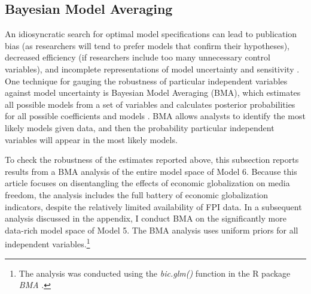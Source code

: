 \documentclass[12pt,a4paper]{article}\usepackage[]{graphicx}\usepackage[]{color}
\begin{document}
\subsection{Bayesian Model Averaging}

An idiosyncratic search for optimal model specifications can lead to publication bias (as researchers will tend to prefer models that confirm their hypotheses), decreased efficiency (if researchers include too many unnecessary control variables), and incomplete representations of model uncertainty and sensitivity \parencite[2]{Montgomery:2010fc}. One technique for gauging the robustness of particular independent variables against model uncertainty is Bayesian Model Averaging (BMA), which estimates all possible models from a set of variables and calculates posterior probabilities for all possible coefficients and models \parencite[4]{Montgomery:2010fc}. BMA allows analysts to identify the most likely models given data, and then the probability particular independent variables will appear in the most likely models.

To check the robustness of the estimates reported above, this subsection reports results from a BMA analysis of the entire model space of Model 6. Because this article focuses on disentangling the effects of economic globalization on media freedom, the analysis includes the full battery of economic globalization indicators, despite the relatively limited availability of FPI data. In a subsequent analysis discussed in the appendix, I conduct BMA on the significantly more data-rich model space of Model 5. The BMA analysis uses uniform priors for all independent variables.\footnote{The analysis was conducted using the \emph{bic.glm()} function in the R package \emph{BMA} \parencite{BMABayesianModel:us}.}
\end{document}
